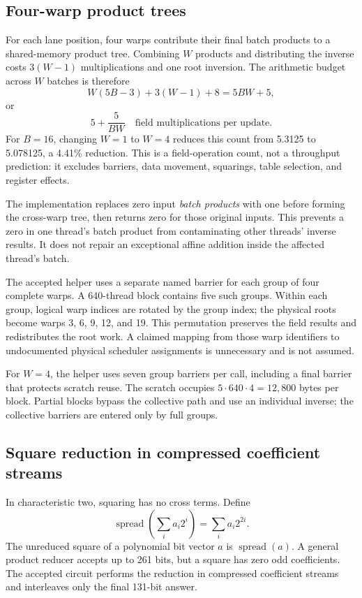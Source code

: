 \documentclass[11pt,a4paper]{article}
\newcommand{\spread}{\operatorname{spread}}
\begin{document}
\subsection{Four-warp product trees}
For each lane position, four warps contribute their final batch products to a shared-memory product tree. Combining $W$ products and distributing the inverse costs $3(W-1)$ multiplications and one root inversion. The arithmetic budget across $W$ batches is therefore
\begin{equation}
 W(5B-3)+3(W-1)+8=5BW+5,
\end{equation}
or
\begin{equation}\label{eq:cost}
 5+\frac{5}{BW}\quad\text{field multiplications per update}.
\end{equation}
For $B=16$, changing $W=1$ to $W=4$ reduces this count from 5.3125 to 5.078125, a 4.41\% reduction. This is a field-operation count, not a throughput prediction: it excludes barriers, data movement, squarings, table selection, and register effects.

The implementation replaces zero input \emph{batch products} with one before forming the cross-warp tree, then returns zero for those original inputs. This prevents a zero in one thread's batch product from contaminating other threads' inverse results. It does not repair an exceptional affine addition inside the affected thread's batch.

The accepted helper uses a separate named barrier for each group of four complete warps. A 640-thread block contains five such groups. Within each group, logical warp indices are rotated by the group index; the physical roots become warps 3, 6, 9, 12, and 19. This permutation preserves the field results and redistributes the root work. A claimed mapping from those warp identifiers to undocumented physical scheduler assignments is unnecessary and is not assumed.

For $W=4$, the helper uses seven group barriers per call, including a final barrier that protects scratch reuse. The scratch occupies $5\cdot640\cdot4=12{,}800$ bytes per block. Partial blocks bypass the collective path and use an individual inverse; the collective barriers are entered only by full groups.

\subsection{Square reduction in compressed coefficient streams}\label{sec:square}
In characteristic two, squaring has no cross terms. Define
\begin{equation}
 \spread\left(\sum_i a_i2^i\right)=\sum_i a_i2^{2i}.
\end{equation}
The unreduced square of a polynomial bit vector $a$ is $\spread(a)$. A general product reducer accepts up to 261 bits, but a square has zero odd coefficients. The accepted circuit performs the reduction in compressed coefficient streams and interleaves only the final 131-bit answer.
\end{document}
